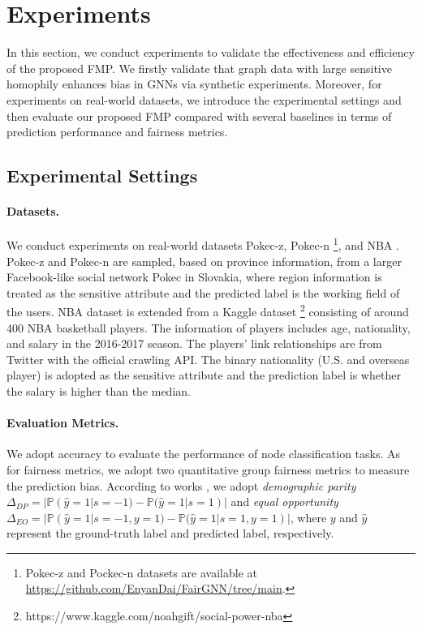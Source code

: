 \documentclass[letterpaper]{article} %
\theoremstyle{plain}
\theoremstyle{definition}
\theoremstyle{remark}
\begin{document}
\section{Experiments}
In this section, we conduct experiments to validate the effectiveness and efficiency of the proposed FMP. We firstly validate that graph data with large sensitive homophily enhances bias in GNNs via synthetic experiments. Moreover, for experiments on real-world datasets, we
introduce the experimental settings and then evaluate our proposed FMP compared with several baselines in terms of prediction performance and fairness metrics.

\subsection{Experimental Settings}
\paragraph{Datasets.} We conduct experiments on real-world datasets Pokec-z, Pokec-n \footnote{Pokec-z and Pockec-n datasets are available at \url{https://github.com/EnyanDai/FairGNN/tree/main}.}, and NBA \citep{dai2021say}. Pokec-z and Pokec-n are sampled, based on province information, from a larger Facebook-like social network Pokec \citep{takac2012data} in Slovakia, where region information is treated as the sensitive attribute and the predicted label is the working field of the users. NBA dataset is extended from a Kaggle dataset \footnote{https://www.kaggle.com/noahgift/social-power-nba} consisting of around 400 NBA basketball players. The information of players includes age, nationality, and salary in the 2016-2017 season. The players' link relationships are from Twitter with the official crawling API. The binary nationality (U.S. and overseas player) is adopted as the sensitive attribute and the prediction label is whether the salary is higher than the median.

\paragraph{Evaluation Metrics.} We adopt accuracy to evaluate the performance of node classification tasks. As for fairness metrics, we adopt two quantitative group fairness metrics to measure the prediction bias. According to works \citep{louizos2015variational,beutel2017data}, we adopt \emph{demographic parity} $\Delta_{DP}=|\mathbb{P}(\hat{y}=1|s=-1)-\mathbb{P}(\hat{y}=1|s=1)|$ and \emph{equal opportunity} $\Delta_{EO}=|\mathbb{P}(\hat{y}=1|s=-1, y=1)-\mathbb{P}(\hat{y}=1|s=1, y=1)|$, where $y$ and $\hat{y}$ represent the ground-truth label and predicted label, respectively.
\end{document}

